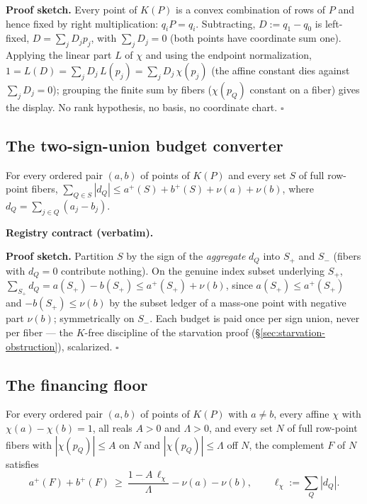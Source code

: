 \noindent\textbf{Proof sketch.} Every point of $K(P)$ is a convex combination of rows
of $P$ and hence fixed by right multiplication: $q_iP=q_i$. Subtracting,
$D:=q_1-q_0$ is left-fixed, $D=\sum_j D_jp_j$, with $\sum_jD_j=0$ (both points have
coordinate sum one). Applying the linear part $L$ of $\chi$ and using the endpoint
normalization, $1=L(D)=\sum_jD_j\,L(p_j)=\sum_jD_j\,\chi(p_j)$ (the affine constant
dies against $\sum_jD_j=0$); grouping the finite sum by fibers ($\chi(p_Q)$ constant
on a fiber) gives the display. No rank hypothesis, no basis, no coordinate chart.
\hfill$\square$

\subsection{The two-sign-union budget converter}

\begin{lemma}\label{lem:hx-signed-variation-ledger}
For every ordered pair $(a,b)$ of points of $K(P)$ and every set $S$ of full
row-point fibers, $\sum_{Q\in S}|d_Q|\le a^+(S)+b^+(S)+\nu(a)+\nu(b)$, where
$d_Q=\sum_{j\in Q}(a_j-b_j)$.
\end{lemma}

\noindent\textbf{Registry contract (verbatim).}

\noindent\textbf{Proof sketch.} Partition $S$ by the sign of the \emph{aggregate}
$d_Q$ into $S_+$ and $S_-$ (fibers with $d_Q=0$ contribute nothing). On the genuine
index subset underlying $S_+$,
$\sum_{S_+}d_Q=a(S_+)-b(S_+)\le a^+(S_+)+\nu(b)$, since $a(S_+)\le a^+(S_+)$ and
$-b(S_+)\le\nu(b)$ by the subset ledger of a mass-one point with negative part
$\nu(b)$; symmetrically on $S_-$. Each budget is paid once per sign union, never per
fiber --- the $K$-free discipline of the starvation proof
(\S\ref{sec:starvation-obstruction}), scalarized. \hfill$\square$

\subsection{The financing floor}

\begin{lemma}\label{lem:hx-financing-floor}
For every ordered pair $(a,b)$ of points of $K(P)$ with $a\ne b$, every affine
$\chi$ with $\chi(a)-\chi(b)=1$, all reals $A>0$ and $\Lambda>0$, and every set $N$
of full row-point fibers with $|\chi(p_Q)|\le A$ on $N$ and $|\chi(p_Q)|\le\Lambda$
off $N$, the complement $F$ of $N$ satisfies
\[
  a^+(F)+b^+(F)\ \ge\ \frac{1-A\,\ell_\chi}{\Lambda}-\nu(a)-\nu(b),
  \qquad \ell_\chi:=\sum_Q|d_Q| .
\]
\end{lemma}

